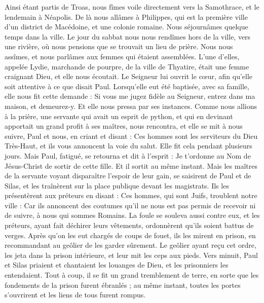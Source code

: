 \begin{multicols}{2}
Ainsi étant partis de Troas, nous fîmes voile directement vers la Samothrace, et le lendemain à Néapolis.
De là nous allâmes à Philippes, qui est la première ville d’un district de Macédoine, et une colonie romaine. Nous séjournâmes quelque temps dans la ville.
Le jour du sabbat nous nous rendîmes hors de la ville, vers une rivière, où nous pensions que se trouvait un lieu de prière. Nous nous assîmes, et nous parlâmes aux femmes qui étaient assemblées.
L’une d’elles, appelée Lydie, marchande de pourpre, de la ville de Thyatire, était une femme craignant Dieu, et elle nous écoutait. Le Seigneur lui ouvrit le cœur, afin qu'elle soit attentive à ce que disait Paul.
Lorsqu’elle eut été baptisée, avec sa famille, elle nous fit cette demande : Si vous me jugez fidèle au Seigneur, entrez dans ma maison, et demeurez-y. Et elle nous pressa par ses instances.
Comme nous allions à la prière, une servante qui avait un esprit de python, et qui en devinant apportait un grand profit à ses maîtres, nous rencontra,
et elle se mit à nous suivre, Paul et nous, en criant et disant : Ces hommes sont les serviteurs du Dieu Très-Haut, et ils vous annoncent la voie du salut.
Elle fit cela pendant plusieurs jours. Mais Paul, fatigué, se retourna et dit à l'esprit : Je t’ordonne au Nom de Jésus-Christ de sortir de cette fille. Et il sortit au même instant.
Mais les maîtres de la servante voyant disparaître l’espoir de leur gain, se saisirent de Paul et de Silas, et les traînèrent sur la place publique devant les magistrats.
Ils les présentèrent aux préteurs en disant : Ces hommes, qui sont Juifs, troublent notre ville :
Car ils annoncent des coutumes qu'il ne nous est pas permis de recevoir ni de suivre, à nous qui sommes Romains.
La foule se souleva aussi contre eux, et les préteurs, ayant fait déchirer leurs vêtements, ordonnèrent qu'ils soient battus de verges.
Après qu’on les eut chargés de coups de fouet, ils les mirent en prison, en recommandant au geôlier de les garder sûrement.
Le geôlier ayant reçu cet ordre, les jeta dans la prison intérieure, et leur mit les ceps aux pieds.
Vers minuit, Paul et Silas priaient et chantaient les louanges de Dieu, et les prisonniers les entendaient.
Tout à coup, il se fit un grand tremblement de terre, en sorte que les fondements de la prison furent ébranlés ; au même instant, toutes les portes s'ouvrirent et les liens de tous furent rompus.

\end{multicols}
